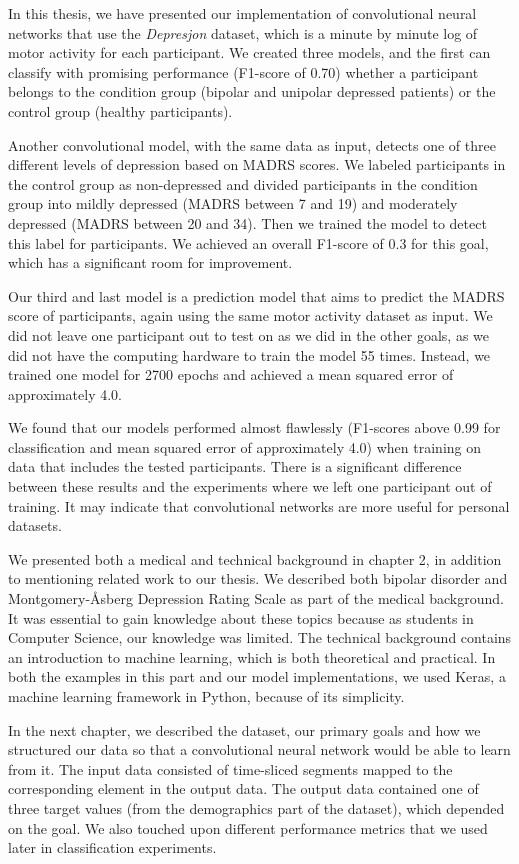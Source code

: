 In this thesis, we have presented our implementation of convolutional neural networks that use the \textit{Depresjon} dataset, which is a minute by minute log of motor activity for each participant. We created three models, and the first can classify with promising performance (F1-score of 0.70) whether a participant belongs to the condition group (bipolar and unipolar depressed patients) or the control group (healthy participants). 

Another convolutional model, with the same data as input, detects one of three different levels of depression based on MADRS scores. We labeled participants in the control group as non-depressed and divided participants in the condition group into mildly depressed (MADRS between 7 and 19) and moderately depressed (MADRS between 20 and 34). Then we trained the model to detect this label for participants. We achieved an overall F1-score of 0.3 for this goal, which has a significant room for improvement.  

Our third and last model is a prediction model that aims to predict the MADRS score of participants, again using the same motor activity dataset as input. We did not leave one participant out to test on as we did in the other goals, as we did not have the computing hardware to train the model 55 times. Instead, we trained one model for 2700 epochs and achieved a mean squared error of approximately 4.0. 

We found that our models performed almost flawlessly (F1-scores above 0.99 for classification and mean squared error of approximately 4.0) when training on data that includes the tested participants. There is a significant difference between these results and the experiments where we left one participant out of training. It may indicate that convolutional networks are more useful for personal datasets. 

We presented both a medical and technical background in chapter 2, in addition to mentioning related work to our thesis. We described both bipolar disorder and Montgomery-Åsberg Depression Rating Scale as part of the medical background. It was essential to gain knowledge about these topics because as students in Computer Science, our knowledge was limited. The technical background contains an introduction to machine learning, which is both theoretical and practical. In both the examples in this part and our model implementations, we used Keras, a machine learning framework in Python, because of its simplicity. 

In the next chapter, we described the dataset, our primary goals and how we structured our data so that a convolutional neural network would be able to learn from it. The input data consisted of time-sliced segments mapped to the corresponding element in the output data. The output data contained one of three target values (from the demographics part of the dataset), which depended on the goal. We also touched upon different performance metrics that we used later in classification experiments.

